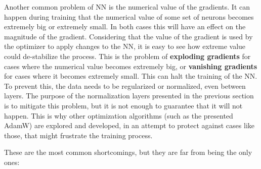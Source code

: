 \documentclass[a4paper, 11pt]{report}
\begin{document}
Another common problem of NN is the numerical value of the gradients. It can happen during training that the numerical value of some set of neurons becomes extremely big or extremely small. In both cases this will have an effect on the magnitude of the gradient. Considering that the value of the gradient is used by the optimizer to apply changes to the NN, it is easy to see how extreme value could de-stabilize the process. This is the problem of \textbf{exploding gradients} for cases where the numerical value becomes extremely big, or \textbf{vanishing gradients} for cases where it becomes extremely small. This can halt the training of the NN. To prevent this, the data needs to be regularized or normalized, even between layers. The purpose of the normalization layers presented in the previous section is to mitigate this problem, but it is not enough to guarantee that it will not happen. This is why other optimization algorithms (such as the presented AdamW) are explored and developed, in an attempt to protect against cases like those, that might frustrate the training process.

These are the most common shortcomings, but they are far from being the only ones:
\end{document}
